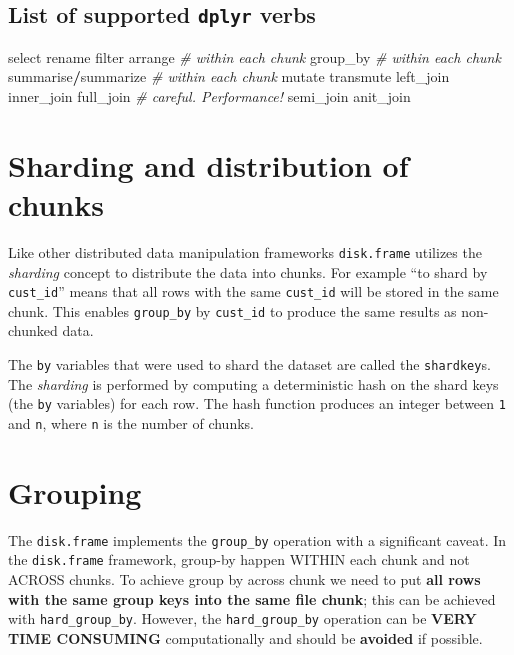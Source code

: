 \documentclass[]{book}
\newenvironment{Shaded}{\begin{snugshade}}{\end{snugshade}}
\newcommand{\CommentTok}[1]{\textcolor[rgb]{0.56,0.35,0.01}{\textit{#1}}}
\newcommand{\NormalTok}[1]{#1}
\newcommand{\OperatorTok}[1]{\textcolor[rgb]{0.81,0.36,0.00}{\textbf{#1}}}
\begin{document}
\hypertarget{list-of-supported-dplyr-verbs}{%
\subsection{\texorpdfstring{List of supported \texttt{dplyr} verbs}{List of supported dplyr verbs}}\label{list-of-supported-dplyr-verbs}}

\begin{Shaded}
\begin{Highlighting}[]
\NormalTok{select}
\NormalTok{rename}
\NormalTok{filter}
\NormalTok{arrange }\CommentTok{# within each chunk}
\NormalTok{group_by }\CommentTok{# within each chunk}
\NormalTok{summarise}\OperatorTok{/}\NormalTok{summarize }\CommentTok{# within each chunk}
\NormalTok{mutate}
\NormalTok{transmute}
\NormalTok{left_join}
\NormalTok{inner_join}
\NormalTok{full_join }\CommentTok{# careful. Performance!}
\NormalTok{semi_join}
\NormalTok{anit_join}
\end{Highlighting}
\end{Shaded}

\hypertarget{sharding-and-distribution-of-chunks}{%
\section{Sharding and distribution of chunks}\label{sharding-and-distribution-of-chunks}}

Like other distributed data manipulation frameworks \texttt{disk.frame} utilizes the \emph{sharding} concept to distribute the data into chunks. For example ``to shard by \texttt{cust\_id}'' means that all rows with the same \texttt{cust\_id} will be stored in the same chunk. This enables \texttt{group\_by} by \texttt{cust\_id} to produce the same results as non-chunked data.

The \texttt{by} variables that were used to shard the dataset are called the \texttt{shardkey}s. The \emph{sharding} is performed by computing a deterministic hash on the shard keys (the \texttt{by} variables) for each row. The hash function produces an integer between \texttt{1} and \texttt{n}, where \texttt{n} is the number of chunks.

\hypertarget{grouping}{%
\section{Grouping}\label{grouping}}

The \texttt{disk.frame} implements the \texttt{group\_by} operation with a significant caveat. In the \texttt{disk.frame} framework, group-by happen WITHIN each chunk and not ACROSS chunks. To achieve group by across chunk we need to put \textbf{all rows with the same group keys into the same file chunk}; this can be achieved with \texttt{hard\_group\_by}. However, the \texttt{hard\_group\_by} operation can be \textbf{VERY TIME CONSUMING} computationally and should be \textbf{avoided} if possible.
\end{document}
